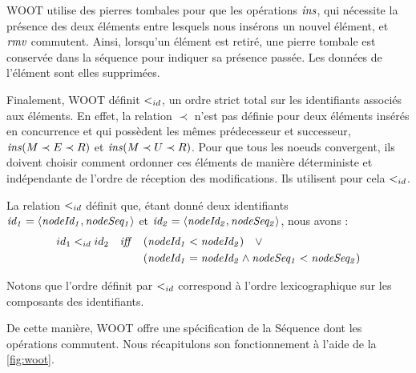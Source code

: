 WOOT utilise des pierres tombales pour que les opérations $\mathit{ins}$, qui nécessite la présence des deux éléments entre lesquels nous insérons un nouvel élément, et $\mathit{rmv}$ commutent.
Ainsi, lorsqu'un élément est retiré, une pierre tombale est conservée dans la séquence pour indiquer sa présence passée.
Les données de l'élément sont elles supprimées.

Finalement, WOOT définit $<_{id}$, un ordre strict total sur les identifiants associés aux éléments.
En effet, la relation $\prec$ n'est pas définie pour deux éléments insérés en concurrence et qui possèdent les mêmes prédecesseur et successeur, \eg $\mathit{ins}(M \prec E \prec R)$ et $\mathit{ins}(M \prec U \prec R)$.
Pour que tous les noeuds convergent, ils doivent choisir comment ordonner ces éléments de manière déterministe et indépendante de l'ordre de réception des modifications.
Ils utilisent pour cela $<_{id}$.
\begin{definition}
  La relation $<_{id}$ définit que, étant donné deux identifiants $\mathit{id_1} = \langle \mathit{nodeId_1},\mathit{nodeSeq_1} \rangle$ et $\mathit{id_2} = \langle \mathit{nodeId_2},\mathit{nodeSeq_2} \rangle$, nous avons :
  \begin{equation*}
    \begin{split}
      id_1 <_{id} id_2 \quad \mathit{iff} \quad  & (\mathit{nodeId_1} < \mathit{nodeId_2}) \quad \lor \\
                                            & (\mathit{nodeId_1} = \mathit{nodeId_2} \land \mathit{nodeSeq_1} < \mathit{nodeSeq_2}) \\
    \end{split}
  \end{equation*}
\end{definition}
Notons que l'ordre définit par $<_{id}$ correspond à l'ordre lexicographique sur les composants des identifiants.

De cette manière, WOOT offre une spécification de la Séquence dont les opérations commutent.
Nous récapitulons son fonctionnement à l'aide de la \autoref{fig:woot}.


